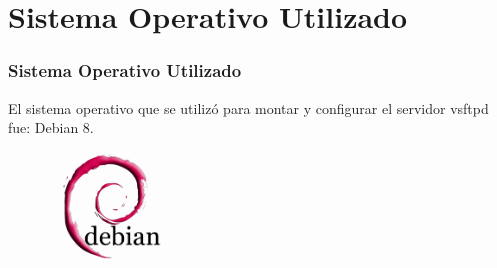 \section{Sistema Operativo Utilizado}
  \begin{frame}
    \frametitle{Sistema Operativo Utilizado}
    El sistema operativo que se utilizó para montar y configurar el servidor vsftpd fue: Debian 8.
     \begin{figure}
      \centering
      \includegraphics[width=0.3\textwidth]{./image/debian.png}
      \label{fig:ejemplo}
      \end{figure}
  \end{frame}